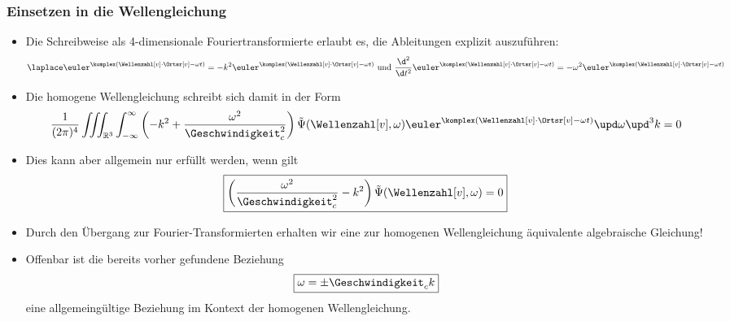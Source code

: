 \begin{frame}
  \frametitle{Einsetzen in die Wellengleichung}
  \begin{itemize}[<+->]
  \item Die Schreibweise als 4-dimensionale Fouriertransformierte erlaubt es, die Ableitungen explizit auszuführen:
    \begin{equation*}
      \laplace \euler^{\komplex(\Wellenzahl[v]\cdot\Ortsr[v]-\omega t)} = -k^2 \euler^{\komplex(\Wellenzahl[v]\cdot\Ortsr[v]-\omega t)} \text{ und } \frac{\d^2}{\d t^2}\euler^{\komplex(\Wellenzahl[v]\cdot\Ortsr[v]-\omega t)}= -\omega^2\euler^{\komplex(\Wellenzahl[v]\cdot\Ortsr[v]-\omega t)}
    \end{equation*}
  \item Die homogene Wellengleichung schreibt sich damit in der Form
    \begin{equation*}
      \frac{1}{(2\pi)^4} \iiint_{\mathbb{R}^3} \int_{-\infty}^\infty \left(-k^2+\frac{\omega^2}{\Geschwindigkeit_c^2} \right)\tilde{\Psi}(\Wellenzahl[v], \omega) \euler^{\komplex(\Wellenzahl[v]\cdot\Ortsr[v]-\omega t)} \upd \omega \upd^3k  = 0
    \end{equation*}
      \item Dies kann aber allgemein nur erfüllt werden, wenn gilt
    \begin{equation*}
     \boxed{\left(\frac{\omega^2}{\Geschwindigkeit_c^2} -k^2 \right)\tilde{\Psi}(\Wellenzahl[v], \omega)  = 0}
    \end{equation*}
  \item Durch den Übergang zur Fourier-Transformierten erhalten wir eine zur homogenen Wellengleichung \alert{äquivalente algebraische Gleichung}!
  \item Offenbar ist die bereits vorher gefundene Beziehung
    \begin{equation*}
      \boxed{\omega = \pm \Geschwindigkeit_c k}
    \end{equation*}
    eine allgemeingültige Beziehung im Kontext der homogenen Wellengleichung.
  \end{itemize}
  \ 
  \end{frame}


